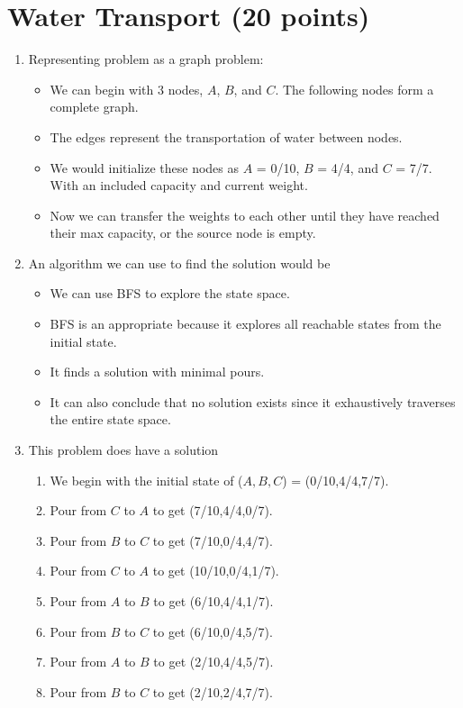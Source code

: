 \documentclass{article}[12pt]
\begin{document}
\section{Water Transport (20 points)}
\begin{enumerate}
  \item Representing problem as a graph problem: 
    \begin{itemize}
      \item We can begin with 3 nodes, $A$, $B$, and $C$. The following nodes form a complete graph.
      \item The edges represent the transportation of water between nodes.
      \item We would initialize these nodes as $A$ = 0/10, $B$ = 4/4, and $C$ = 7/7.
        With an included capacity and current weight.
      \item Now we can transfer the weights to each other until they have reached their max capacity, or the source node is empty.
    \end{itemize}
  \item An algorithm we can use to find the solution would be
    \begin{itemize}
      \item We can use BFS to explore the state space.
      \item BFS is an appropriate because it explores all reachable states from the initial state.
      \item It finds a solution with minimal pours.
      \item It can also conclude that no solution exists since it exhaustively traverses the entire state space.
    \end{itemize}
    \item This problem does have a solution
      \begin{enumerate}
        \item We begin with the initial state of ($A,B,C$) = (0/10,4/4,7/7).
        \item Pour from $C$ to $A$ to get (7/10,4/4,0/7).
        \item Pour from $B$ to $C$ to get (7/10,0/4,4/7).
        \item Pour from $C$ to $A$ to get (10/10,0/4,1/7).
        \item Pour from $A$ to $B$ to get (6/10,4/4,1/7).
        \item Pour from $B$ to $C$ to get (6/10,0/4,5/7). %
        \item Pour from $A$ to $B$ to get (2/10,4/4,5/7).
        \item Pour from $B$ to $C$ to get (2/10,2/4,7/7).
      \end{enumerate}
\end{enumerate}
\end{document}

